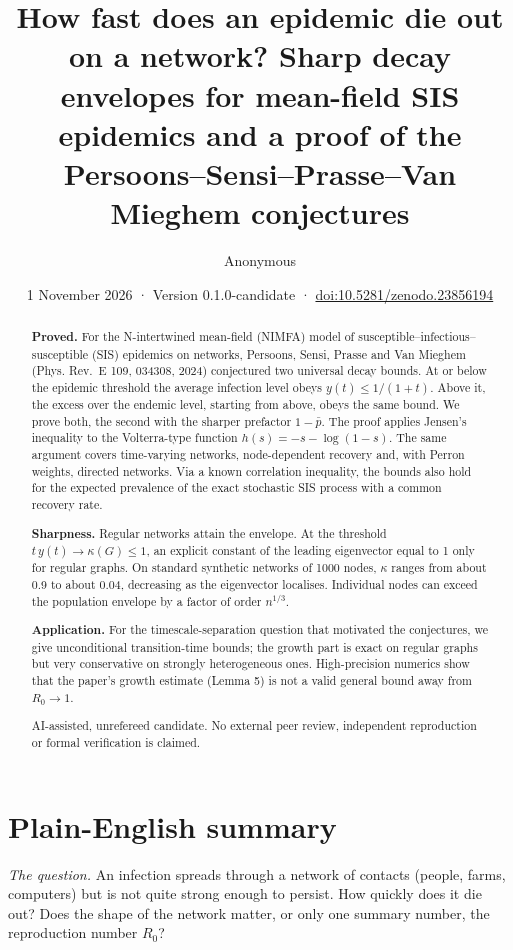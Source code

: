 \documentclass[
  11pt,
  a4paper,
]{article}
\title{How fast does an epidemic die out on a network? Sharp decay
envelopes for mean-field SIS epidemics and a proof of the
Persoons--Sensi--Prasse--Van Mieghem conjectures}
\author{Anonymous}
\date{1 November 2026 · Version 0.1.0-candidate ·
\href{https://doi.org/10.5281/zenodo.23856194}{doi:10.5281/zenodo.23856194}}
\begin{document}
\maketitle
\begin{abstract}
\textbf{Proved.} For the N-intertwined mean-field (NIMFA) model of
susceptible--infectious--susceptible (SIS) epidemics on networks,
Persoons, Sensi, Prasse and Van Mieghem (Phys. Rev.~E 109, 034308, 2024)
conjectured two universal decay bounds. At or below the epidemic
threshold the average infection level obeys \(y(t)\le1/(1+t)\). Above
it, the excess over the endemic level, starting from above, obeys the
same bound. We prove both, the second with the sharper prefactor
\(1-\bar p\). The proof applies Jensen's inequality to the Volterra-type
function \(h(s)=-s-\log(1-s)\). The same argument covers time-varying
networks, node-dependent recovery and, with Perron weights, directed
networks. Via a known correlation inequality, the bounds also hold for
the expected prevalence of the exact stochastic SIS process with a
common recovery rate.

\textbf{Sharpness.} Regular networks attain the envelope. At the
threshold \(t\,y(t)\to\kappa(G)\le1\), an explicit constant of the
leading eigenvector equal to 1 only for regular graphs. On standard
synthetic networks of 1000 nodes, \(\kappa\) ranges from about 0.9 to
about 0.04, decreasing as the eigenvector localises. Individual nodes
can exceed the population envelope by a factor of order \(n^{1/3}\).

\textbf{Application.} For the timescale-separation question that
motivated the conjectures, we give unconditional transition-time bounds;
the growth part is exact on regular graphs but very conservative on
strongly heterogeneous ones. High-precision numerics show that the
paper's growth estimate (Lemma 5) is not a valid general bound away from
\(R_0\to1\).

AI-assisted, unrefereed candidate. No external peer review, independent
reproduction or formal verification is claimed.
\end{abstract}

\section{Plain-English summary}\label{plain-english-summary}

\emph{The question.} An infection spreads through a network of contacts
(people, farms, computers) but is not quite strong enough to persist.
How quickly does it die out? Does the shape of the network matter, or
only one summary number, the reproduction number \(R_0\)?
\end{document}
